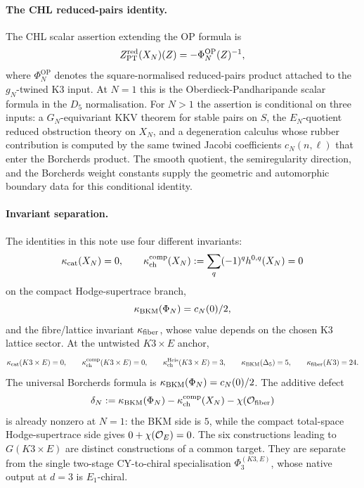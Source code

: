 \paragraph{The CHL reduced-pairs identity.}
The CHL scalar assertion extending the OP formula is
\[
  Z^{\mathrm{red}}_{\mathrm{PT}}(X_N)(Z)
  =-\Phi_N^{\mathrm{OP}}(Z)^{-1},
\]
where $\Phi_N^{\mathrm{OP}}$ denotes the square-normalised reduced-pairs
product attached to the $g_N$-twined K3 input.  At $N=1$ this is the
Oberdieck-Pandharipande scalar formula in the $D_5$ normalisation.
For $N>1$ the assertion is conditional on three inputs: a
$G_N$-equivariant KKV theorem for stable pairs on $S$, the
$E_N$-quotient reduced obstruction theory on $X_N$, and a degeneration
calculus whose rubber contribution is computed by the same twined
Jacobi coefficients $c_N(n,\ell)$ that enter the Borcherds product.
The smooth quotient, the semiregularity direction, and the Borcherds
weight constants supply the geometric and automorphic boundary data for
this conditional identity.

\paragraph{Invariant separation.}
The identities in this note use four different invariants:
\[
  \kappa_{\mathrm{cat}}(X_N)=0,\qquad
  \kappa_{\mathrm{ch}}^{\mathrm{comp}}(X_N):=\sum_q(-1)^qh^{0,q}(X_N)=0
\]
on the compact Hodge-supertrace branch,
\[
  \kappa_{\mathrm{BKM}}(\Phi_N)=c_N(0)/2,
\]
and the fibre/lattice invariant $\kappa_{\mathrm{fiber}}$, whose value depends on the
chosen K3 lattice sector.  At the untwisted $K3\times E$ anchor,
\[
  \kappa_{\mathrm{cat}}(K3\times E)=0,\qquad
  \kappa_{\mathrm{ch}}^{\mathrm{comp}}(K3\times E)=0,\qquad
  \kappa_{\mathrm{ch}}^{\mathrm{Heis}}(K3\times E)=3,\qquad
  \kappa_{\mathrm{BKM}}(\Delta_5)=5,\qquad
  \kappa_{\mathrm{fiber}}(K3)=24.
\]
The universal Borcherds formula is $\kappa_{\mathrm{BKM}}(\Phi_N)=c_N(0)/2$.  The
additive defect
\[
  \delta_N :=
  \kappa_{\mathrm{BKM}}(\Phi_N)-\kappa_{\mathrm{ch}}^{\mathrm{comp}}(X_N)-\chi(\mathcal{O}_{\mathrm{fiber}})
\]
is already nonzero at $N=1$: the BKM side is $5$, while the compact
total-space Hodge-supertrace side gives $0+\chi(\mathcal{O}_E)=0$.  The six
constructions leading to $G(K3\times E)$ are distinct constructions of
a common target.  They are separate from the single two-stage
CY-to-chiral specialisation $\Phi_3^{(K3,E)}$, whose native output at
$d=3$ is $E_1$-chiral.
